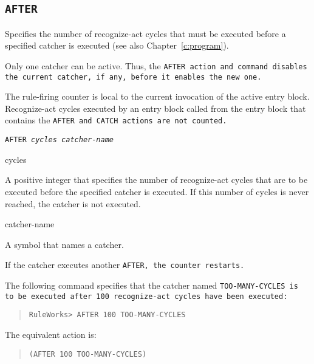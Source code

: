 \subsection{\tt{AFTER}}

Specifies the number of recognize-act cycles that must be executed
before a specified catcher is executed (see also
Chapter~\ref{c:program}).

Only one catcher can be active. Thus, the \tt{AFTER} action and
command disables the current catcher, if any, before it enables the
new one.

The rule-firing counter is local to the current invocation of the
active entry block. Recognize-act cycles executed by an entry block
called from the entry block that contains the \tt{AFTER} and
\tt{CATCH} actions are not counted.

\Format

\tt{AFTER} \it{cycles} \it{catcher-name}

\begin{arguments}
\item[cycles]

  A positive integer that specifies the number of recognize-act cycles
  that are to be executed before the specified catcher is executed. If
  this number of cycles is never reached, the catcher is not executed.

\item[catcher-name]

  A symbol that names a catcher.

  If the catcher executes another \tt{AFTER}, the counter restarts.
\end{arguments}

\Example

The following command specifies that the catcher named
\tt{TOO-MANY-CYCLES} is to be executed after 100 recognize-act
cycles have been executed:

\begin{quote}
\begin{verbatim}
RuleWorks> AFTER 100 TOO-MANY-CYCLES
\end{verbatim}
\end{quote}

The equivalent action is:

\begin{quote}
\begin{verbatim}
(AFTER 100 TOO-MANY-CYCLES)
\end{verbatim}
\end{quote}

